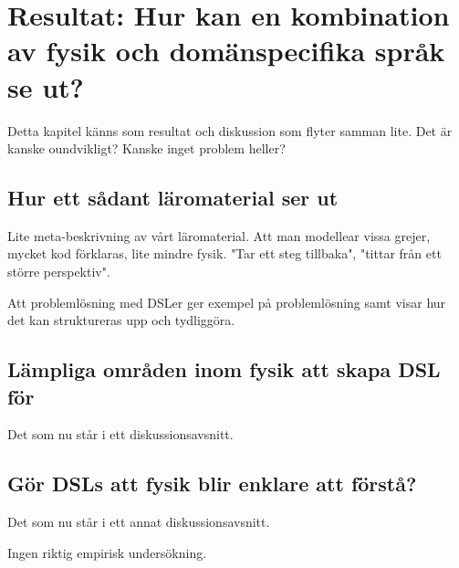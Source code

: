 
\chapter{Resultat: Hur kan en kombination av fysik och domänspecifika språk se ut?}
\begin{binge}

Detta kapitel känns som resultat och diskussion som flyter samman lite. Det är kanske oundvikligt? Kanske inget problem heller?

\section{Hur ett sådant läromaterial ser ut}

Lite meta-beskrivning av vårt läromaterial. Att man modellear vissa grejer, mycket kod förklaras, lite mindre fysik. "Tar ett steg tillbaka", "tittar från ett större perspektiv".

Att problemlösning med DSLer ger exempel på problemlösning samt visar hur det kan struktureras upp och tydliggöra.

\section{Lämpliga områden inom fysik att skapa DSL för}

Det som nu står i ett diskussionsavsnitt.

\section{Gör DSLs att fysik blir enklare att förstå?}

Det som nu står i ett annat diskussionsavsnitt.

Ingen riktig empirisk undersökning.

\end{binge}
